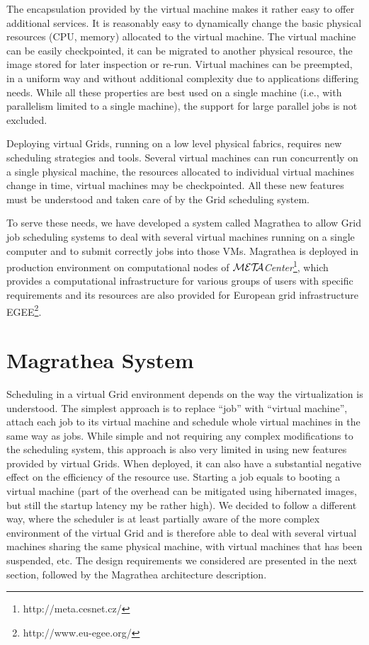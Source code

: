 \documentclass[a4paper]{article}
\def\META#1{\textit{${\cal MET\!\!A}$#1}}
\begin{document}
The encapsulation provided by the virtual machine makes it rather easy to
offer additional services. It is reasonably easy to dynamically change the
basic physical resources (CPU, memory) allocated to the virtual machine. The
virtual machine can be easily checkpointed, it can be migrated to another
physical resource, the image stored for later inspection or re-run. Virtual
machines can be preempted, in a uniform way and without additional complexity
due to applications differing needs. While all these properties are best used
on a single machine (i.e., with parallelism limited to a single machine), the
support for large parallel jobs is not excluded.

Deploying virtual Grids, running on a low level physical fabrics, requires new
scheduling strategies and tools. Several virtual machines can run concurrently
on a single physical machine, the resources allocated to individual virtual
machines change in time, virtual machines may be checkpointed. All these new
features must be understood and taken care of by the Grid scheduling system.

To serve these needs, we have developed a system called Magrathea to allow
Grid job scheduling systems to deal with several virtual machines running on a
single computer and to submit correctly jobs into those VMs. Magrathea is
deployed in production environment on computational nodes of
\META{Center}\footnote{http://meta.cesnet.cz/}, which provides a computational
infrastructure for various groups of users with specific requirements and its
resources are also provided for European grid infrastructure
EGEE\footnote{http://www.eu-egee.org/}. 

\section{Magrathea System}
\label{sec:magrathea}

Scheduling in a virtual Grid environment depends on the way the virtualization
is understood. The simplest approach is to replace ``job'' with ``virtual
machine'', attach each job to its virtual machine and schedule whole virtual
machines in the same way as jobs. While simple and not requiring any complex
modifications to the scheduling system, this approach is also very limited in
using new features provided by virtual Grids. When deployed, it can also have
a substantial negative effect on the efficiency of the resource use. Starting
a job equals to booting a virtual machine (part of the overhead can be
mitigated using hibernated images, but still the startup latency my be rather
high). We decided to follow a different way, where the scheduler is at least
partially aware of the more complex environment of the virtual Grid and is
therefore able to deal with several virtual machines sharing the same physical
machine, with virtual machines that has been suspended, etc. The design
requirements we considered are presented in the next section, followed by the
Magrathea architecture description.
\end{document}
